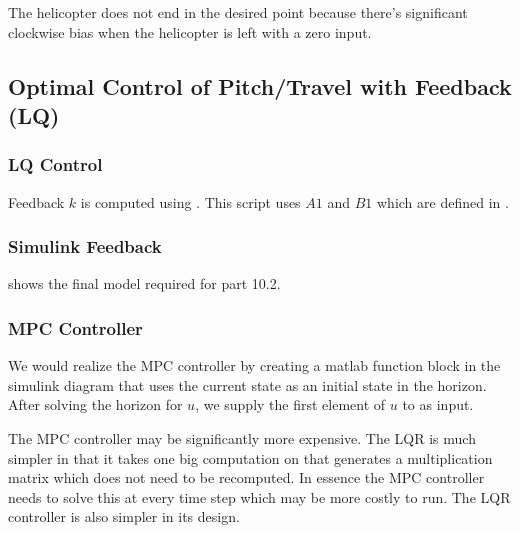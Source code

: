 The helicopter does not end in the desired point because there's significant clockwise bias when the helicopter is left with a zero input.

\subsection{Optimal Control of Pitch/Travel with Feedback (LQ)}

\subsubsection{LQ Control}
Feedback $k$ is computed using .  This script uses $A1$ and $B1$ which are defined in .

\subsubsection{Simulink Feedback}

 shows the final model required for part 10.2.


\subsubsection{MPC Controller}
We would realize the MPC controller by creating a matlab function block in the simulink diagram that uses the current state as an initial state in the horizon. After solving the horizon for $u$, we supply the first element of $u$ to as input.

The MPC controller may be significantly more expensive. The LQR is much simpler in that it takes one big computation on that generates a multiplication matrix which does not need to be recomputed. In essence the MPC controller needs to solve this at every time step which may be more costly to run. The LQR controller is also simpler in its design.

